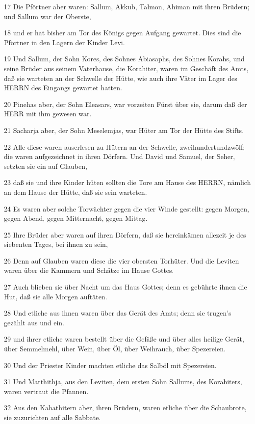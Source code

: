 \par 17 Die Pförtner aber waren: Sallum, Akkub, Talmon, Ahiman mit ihren Brüdern; und Sallum war der Oberste,
\par 18 und er hat bisher am Tor des Königs gegen Aufgang gewartet. Dies sind die Pförtner in den Lagern der Kinder Levi.
\par 19 Und Sallum, der Sohn Kores, des Sohnes Abiasaphs, des Sohnes Korahs, und seine Brüder aus seinem Vaterhause, die Korahiter, waren im Geschäft des Amts, daß sie warteten an der Schwelle der Hütte, wie auch ihre Väter im Lager des HERRN des Eingangs gewartet hatten.
\par 20 Pinehas aber, der Sohn Eleasars, war vorzeiten Fürst über sie, darum daß der HERR mit ihm gewesen war.
\par 21 Sacharja aber, der Sohn Meselemjas, war Hüter am Tor der Hütte des Stifts.
\par 22 Alle diese waren auserlesen zu Hütern an der Schwelle, zweihundertundzwölf; die waren aufgezeichnet in ihren Dörfern. Und David und Samuel, der Seher, setzten sie ein auf Glauben,
\par 23 daß sie und ihre Kinder hüten sollten die Tore am Hause des HERRN, nämlich an dem Hause der Hütte, daß sie sein warteten.
\par 24 Es waren aber solche Torwächter gegen die vier Winde gestellt: gegen Morgen, gegen Abend, gegen Mitternacht, gegen Mittag.
\par 25 Ihre Brüder aber waren auf ihren Dörfern, daß sie hereinkämen allezeit je des siebenten Tages, bei ihnen zu sein,
\par 26 Denn auf Glauben waren diese die vier obersten Torhüter. Und die Leviten waren über die Kammern und Schätze im Hause Gottes.
\par 27 Auch blieben sie über Nacht um das Haus Gottes; denn es gebührte ihnen die Hut, daß sie alle Morgen auftäten.
\par 28 Und etliche aus ihnen waren über das Gerät des Amts; denn sie trugen's gezählt aus und ein.
\par 29 und ihrer etliche waren bestellt über die Gefäße und über alles heilige Gerät, über Semmelmehl, über Wein, über Öl, über Weihrauch, über Spezereien.
\par 30 Und der Priester Kinder machten etliche das Salböl mit Spezereien.
\par 31 Und Matthithja, aus den Leviten, dem ersten Sohn Sallums, des Korahiters, waren vertraut die Pfannen.
\par 32 Aus den Kahathitern aber, ihren Brüdern, waren etliche über die Schaubrote, sie zuzurichten auf alle Sabbate.
